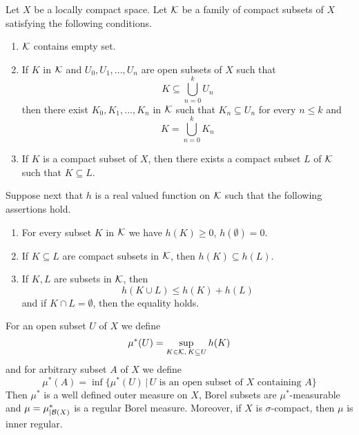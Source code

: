 \begin{theorem}\label{theorem:extensionofmeasureoncompactclass}
Let $X$ be a locally compact space. Let ${\mathcal K}$ be a family of compact subsets of $X$ satisfying the following conditions.
\begin{enumerate}[label=\emph{\textbf{(\arabic*)}}, leftmargin=3.0em]
\item ${\mathcal K}$ contains empty set.
\item If $K$ in ${\mathcal K}$ and $U_0,U_1,...,U_n$ are open subsets of $X$ such that
$$K\subseteq \bigcup_{n=0}^kU_n$$
then there exist $K_0,K_1,...,K_n$ in ${\mathcal K}$ such that $K_n\subseteq U_n$ for every $n\leq k$ and
$$K = \bigcup_{n=0}^kK_n$$
\item If $K$ is a compact subset of $X$, then there exists a compact subset $L$ of ${\mathcal K}$ such that $K\subseteq L$.
\end{enumerate}
Suppose next that $h$ is a real valued function on ${\mathcal K}$ such that the following assertions hold.
\begin{enumerate}[label=\emph{\textbf{(\arabic*)}}, leftmargin=3.0em]
\item For every subset $K$ in ${\mathcal K}$ we have $h(K)\geq 0$, $h(\emptyset) = 0$.
\item If $K\subseteq L$ are compact subsets in ${\mathcal K}$, then $h(K)\subseteq h(L)$.
\item If $K, L$ are subsets in ${\mathcal K}$, then
$$h(K\cup L) \leq h(K) + h(L)$$
and if $K \cap L = \emptyset$, then the equality holds.
\end{enumerate}
For an open subset $U$ of $X$ we define
$$\mu^*(U) = \sup_{K\in {\mathcal K},\,K\subseteq U}h(K)$$
and for arbitrary subset $A$ of $X$ we define
$$\mu^*(A) = \inf \big\{\mu^*(U)\,\big|\,U\mbox{ is an open subset of }X\mbox{ containing }A\big\}$$
Then $\mu^*$ is a well defined outer measure on $X$, Borel subsets are $\mu^*$-measurable and $\mu = \mu^*_{\mid {\mathcal B}(X)}$ is a regular Borel measure. Moreover, if $X$ is $\sigma$-compact, then $\mu$ is inner regular.
\end{theorem}
